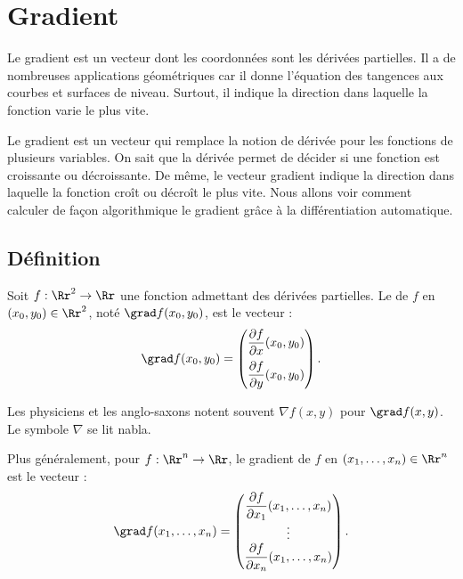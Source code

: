 




\section{Gradient}

Le gradient est un vecteur dont les coordonnées sont les dérivées partielles. Il a de nombreuses applications géométriques car il donne l'équation des tangences aux courbes et surfaces de niveau. Surtout, il indique la direction dans laquelle la fonction varie le plus vite.

Le gradient est un vecteur qui remplace la notion de dérivée pour les fonctions de plusieurs variables. On sait que la dérivée permet de décider si une fonction est croissante ou décroissante. De même, le vecteur gradient indique la direction dans laquelle la fonction croît ou décroît le plus vite. Nous allons voir comment calculer de façon algorithmique le gradient grâce à la \og{}différentiation automatique\fg{}.

\subsection{Définition}

\begin{definition}{}{}
	Soit $f : \Rr^2 \to \Rr$ une fonction admettant des dérivées partielles.
	Le  de $f$ en $(x_0,y_0) \in \Rr^2$, noté 
	$\grad f (x_0,y_0)$, est le vecteur :
	$$\grad f (x_0,y_0) =
	\begin{pmatrix} \dfrac{\partial f}{\partial x} (x_0,y_0)\\[2ex] \dfrac{\partial f}{\partial y}(x_0,y_0)\end{pmatrix}.$$
\end{definition}

Les physiciens et les anglo-saxons notent souvent $\nabla f (x,y)$ pour $\grad f (x,y)$. Le symbole $\nabla$ se lit \og{}nabla\fg{}.


Plus généralement, pour $f : \Rr^n \to \Rr$, le gradient de $f$ en $(x_1,\ldots,x_n) \in \Rr^n$ est le vecteur :
$$\grad f (x_1,\ldots,x_n) =
\begin{pmatrix} \dfrac{\partial f}{\partial x_{1}} (x_1,\ldots,x_n)\\ \vdots \\ \dfrac{\partial f}{\partial x_n}(x_1,\ldots,x_n)\end{pmatrix}.$$



